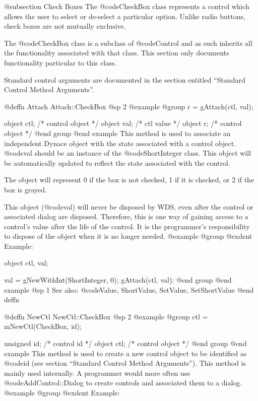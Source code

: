 @subsection Check Boxes
The @code{CheckBox} class represents a control which allows the user
to select or de-select a particular option.  Unlike radio buttons,
check boxes are not mutually exclusive.

The @code{CheckBox} class is a subclass of @code{Control} and as such
inherits all the functionality associated with that class.  This section
only documents functionality particular to this class.

Standard control arguments are documented in the section entitled
``Standard Control Method Arguments''.








@deffn {Attach} Attach::CheckBox
@sp 2
@example
@group
r = gAttach(ctl, val);

object  ctl;   /*  control object  */
object  val;   /*  ctl value       */
object  r;     /*  control object  */
@end group
@end example
This method is used to associate an independent Dynace object with the
state associated with a control object.  @code{val} should be an
instance of the @code{ShortInteger} class.  This object will be
automatically updated to reflect the state associated with the control.

The object will represent 0 if the box is not checked, 1 if it is
checked, or 2 if the box is grayed.

This object (@code{val}) will never be disposed by WDS, even after
the control or associated dialog are disposed.  Therefore, this
is one way of gaining access to a control's value after the life
of the control.  It is the programmer's responsibility to dispose of
the object when it is no longer needed.
@example
@group
@exdent Example:

object  ctl, val;

val = gNewWithInt(ShortInteger, 0);
gAttach(ctl, val);
@end group
@end example
@sp 1
See also:  @code{Value, ShortValue, SetValue, SetShortValue}
@end deffn












@deffn {NewCtl} NewCtl::CheckBox
@sp 2
@example
@group
ctl = mNewCtl(CheckBox, id);

unsigned  id;   /*  control id      */
object   ctl;   /*  control object  */
@end group
@end example
This method is used to create a new control object to be identified as
@code{id} (see section ``Standard Control Method Arguments'').  This
method is mainly used internally.  A programmer would more often
use @code{AddControl::Dialog} to create controls and associated them
to a dialog.
@example
@group
@exdent Example:

